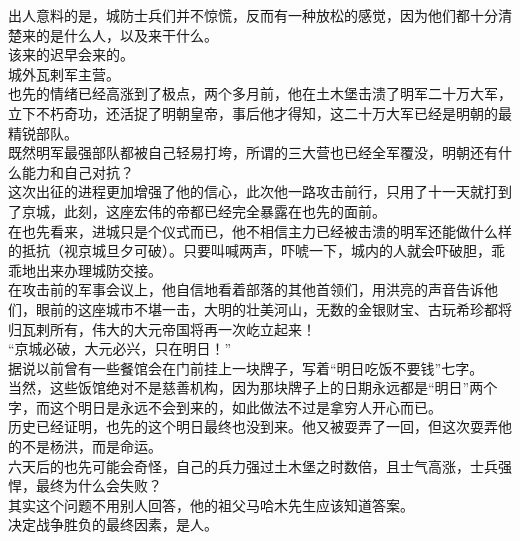 \begin{multicols}{\theparacolNo}
出人意料的是，城防士兵们并不惊慌，反而有一种放松的感觉，因为他们都十分清楚来的是什么人，以及来干什么。\\

该来的迟早会来的。\\

城外瓦剌军主营。\\

也先的情绪已经高涨到了极点，两个多月前，他在土木堡击溃了明军二十万大军，立下不朽奇功，还活捉了明朝皇帝，事后他才得知，这二十万大军已经是明朝的最精锐部队。\\

既然明军最强部队都被自己轻易打垮，所谓的三大营也已经全军覆没，明朝还有什么能力和自己对抗？\\

这次出征的进程更加增强了他的信心，此次他一路攻击前行，只用了十一天就打到了京城，此刻，这座宏伟的帝都已经完全暴露在也先的面前。\\

在也先看来，进城只是个仪式而已，他不相信主力已经被击溃的明军还能做什么样的抵抗（视京城旦夕可破）。只要叫喊两声，吓唬一下，城内的人就会吓破胆，乖乖地出来办理城防交接。\\

在攻击前的军事会议上，他自信地看着部落的其他首领们，用洪亮的声音告诉他们，眼前的这座城市不堪一击，大明的壮美河山，无数的金银财宝、古玩希珍都将归瓦剌所有，伟大的大元帝国将再一次屹立起来！\\

“京城必破，大元必兴，只在明日！”\\

据说以前曾有一些餐馆会在门前挂上一块牌子，写着“明日吃饭不要钱”七字。\\

当然，这些饭馆绝对不是慈善机构，因为那块牌子上的日期永远都是“明日”两个字，而这个明日是永远不会到来的，如此做法不过是拿穷人开心而已。\\

历史已经证明，也先的这个明日最终也没到来。他又被耍弄了一回，但这次耍弄他的不是杨洪，而是命运。\\

六天后的也先可能会奇怪，自己的兵力强过土木堡之时数倍，且士气高涨，士兵强悍，最终为什么会失败？\\

其实这个问题不用别人回答，他的祖父马哈木先生应该知道答案。\\

决定战争胜负的最终因素，是人。\\


\end{multicols}
